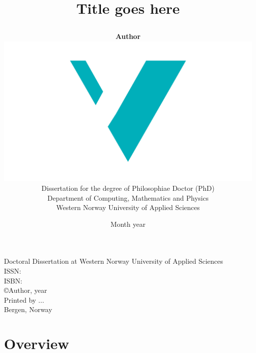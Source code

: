 \documentclass[10pt]{book}
\title{
{\fontsize{28}{30}\usefont{OT1}{phv}{bc}{n}\selectfont Title goes here}
	\author{
	\textbf{Author}\vspace{3cm}\\
		\includegraphics[scale=0.36]{logos/logo.pdf}\vspace{1em}\\
		Dissertation for the degree of Philosophiae Doctor (PhD)\vspace{3.5em}\\
		Department of Computing, Mathematics and Physics \\
		Western Norway University of Applied Sciences
	}
	\date{Month year}
}
\begin{document}

\ifDownscaledFinalDoc
	\fontsize{\TextSize}{\BaseLineSkip}
	\selectfont
\fi

\ifDraft
	\doublespacing
\fi


\maketitle
\normalsize\vspace*{15cm}
\begin{minipage}{13cm}
Doctoral Dissertation at Western Norway University of Applied Sciences\\
ISSN: \\ %
ISBN: \\[2ex] %
\copyright{Author}, year\\[2ex] %
Printed by ...\\
Bergen, Norway
\end{minipage}

\frontmatter





\tableofcontents
\mainmatter

%
%
\part{Overview}
\label{part:1}



%
%
%


\end{document}
